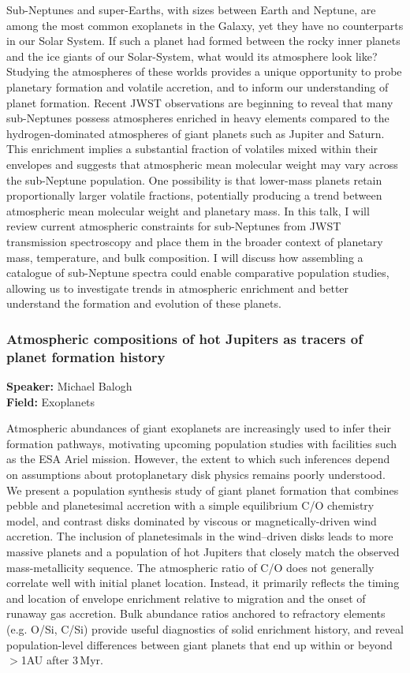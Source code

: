 Sub-Neptunes and super-Earths, with sizes between Earth and Neptune, are among the most common exoplanets in the Galaxy, yet they have no counterparts in our Solar System. If such a planet had formed between the rocky inner planets and the ice giants of our Solar-System, what would its atmosphere look like? Studying the atmospheres of these worlds provides a unique opportunity to probe planetary formation and volatile accretion, and to inform our understanding of planet formation. Recent JWST observations are beginning to reveal that many sub-Neptunes possess atmospheres enriched in heavy elements compared to the hydrogen-dominated atmospheres of giant planets such as Jupiter and Saturn. This enrichment implies a substantial fraction of volatiles mixed within their envelopes and suggests that atmospheric mean molecular weight may vary across the sub-Neptune population. One possibility is that lower-mass planets retain proportionally larger volatile fractions, potentially producing a trend between atmospheric mean molecular weight and planetary mass. In this talk, I will review current atmospheric constraints for sub-Neptunes from JWST transmission spectroscopy and place them in the broader context of planetary mass, temperature, and bulk composition. I will discuss how assembling a catalogue of sub-Neptune spectra could enable comparative population studies, allowing us to investigate trends in atmospheric enrichment and better understand the formation and evolution of these planets.

\hypertarget{abstract-talk-82}{}\label{abstract-page-talk-82}
\subsubsection*{Atmospheric compositions of hot Jupiters as tracers of planet formation history}
\textbf{Speaker:} Michael Balogh\\
\textbf{Field:} Exoplanets

Atmospheric abundances of giant exoplanets are increasingly used to infer their formation pathways, motivating upcoming population studies with facilities such as the ESA Ariel mission. However, the extent to which such inferences depend on assumptions about protoplanetary disk physics remains poorly understood. We present a population synthesis study of giant planet formation that combines pebble and planetesimal accretion with a simple equilibrium C/O chemistry model, and contrast disks dominated by viscous or magnetically-driven wind accretion. The inclusion of planetesimals in the wind--driven disks leads to more massive planets and a population of hot Jupiters that closely match the observed mass-metallicity sequence. The atmospheric ratio of C/O does not generally correlate well with initial planet location. Instead, it primarily reflects the timing and location of envelope enrichment relative to migration and the onset of runaway gas accretion. Bulk abundance ratios anchored to refractory elements (e.g. O/Si, C/Si) provide useful diagnostics of solid enrichment history, and reveal population-level differences between giant planets that end up within or beyond $>$1AU after 3\,Myr.

